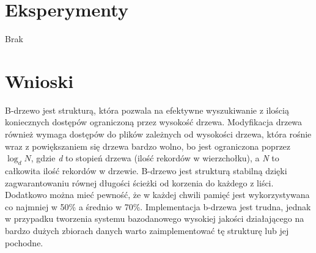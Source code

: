 \documentclass{article}
\begin{document}
    \section{Eksperymenty}
    Brak

    \section{Wnioski}
    B-drzewo jest strukturą, która pozwala na efektywne wyszukiwanie z ilością
    koniecznych dostępów ograniczoną przez wysokość drzewa. Modyfikacja drzewa również
    wymaga dostępów do plików zależnych od wysokości drzewa, która rośnie 
    wraz z powiększaniem się drzewa bardzo wolno, bo jest ograniczona poprzez 
    \emph{$\log_d N$}, gdzie
    \emph{d} to stopień drzewa (ilość rekordów w wierzchołku), a \emph{N} to całkowita
    ilość rekordów w drzewie. B-drzewo jest strukturą stabilną dzięki zagwarantowaniu
    równej długości ścieżki od korzenia do każdego z liści.
    Dodatkowo można mieć pewność, że w każdej chwili pamięć 
    jest wykorzystywana co najmniej w 50\% a średnio w 70\%. Implementacja b-drzewa 
    jest trudna, jednak w przypadku tworzenia systemu bazodanowego wysokiej jakości
    działającego na bardzo dużych zbiorach danych warto zaimplementować tę strukturę
    lub jej pochodne.
\end{document}
